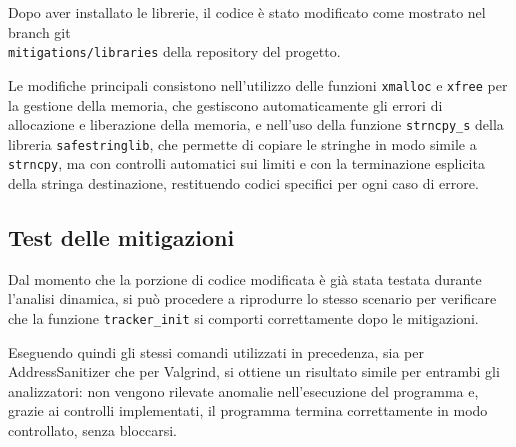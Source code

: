 Dopo aver installato le librerie, il codice è stato modificato come mostrato nel
branch git \\ \texttt{mitigations/libraries} della repository del progetto.






Le modifiche principali consistono nell'utilizzo delle funzioni \texttt{xmalloc}
e \texttt{xfree} per la gestione della memoria, che gestiscono automaticamente
gli errori di allocazione e liberazione della memoria, e nell'uso della funzione
\texttt{strncpy\_s} della libreria \texttt{safestringlib}, che permette di
copiare le stringhe in modo simile a \texttt{strncpy}, ma con controlli
automatici sui limiti e con la terminazione esplicita della stringa destinazione,
restituendo codici specifici per ogni caso di errore.

\subsection*{Test delle mitigazioni}
\label{sec:test-mitigations}

Dal momento che la porzione di codice modificata è già stata testata durante l'analisi
dinamica, si può procedere a riprodurre lo stesso scenario per verificare che la
funzione \texttt{tracker\_init} si comporti correttamente dopo le mitigazioni.

Eseguendo quindi gli stessi comandi utilizzati in precedenza, sia per AddressSanitizer
che per Valgrind, si ottiene un risultato simile per entrambi gli analizzatori: non
vengono rilevate anomalie nell'esecuzione del programma e, grazie ai controlli
implementati, il programma termina correttamente in modo controllato, senza
bloccarsi.

